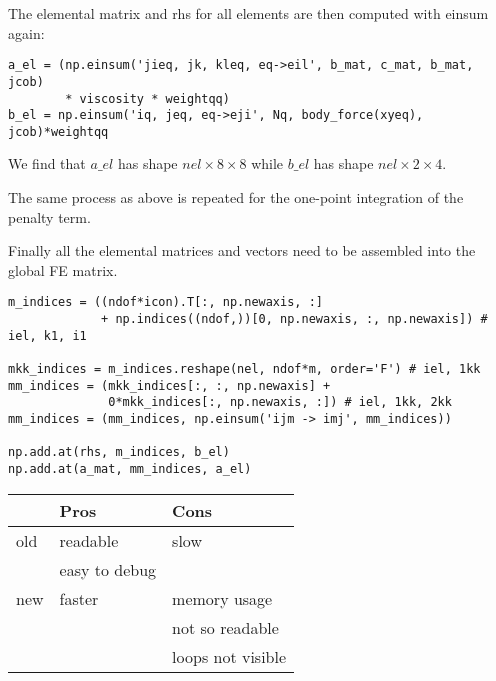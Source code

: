 The elemental matrix and rhs for all elements are then computed with einsum again:
\begin{lstlisting}
a_el = (np.einsum('jieq, jk, kleq, eq->eil', b_mat, c_mat, b_mat, jcob)
        * viscosity * weightqq)
b_el = np.einsum('iq, jeq, eq->eji', Nq, body_force(xyeq), jcob)*weightqq
\end{lstlisting}
We find that $a\_el$ has shape $nel\times8 \times 8$ while
$b\_el$ has shape $nel\times 2\times4$.

The same process as above is repeated for the one-point integration of the 
penalty term. 

Finally all the elemental matrices and vectors need to be assembled into 
the global FE matrix. 

\begin{lstlisting}
m_indices = ((ndof*icon).T[:, np.newaxis, :]
             + np.indices((ndof,))[0, np.newaxis, :, np.newaxis]) # iel, k1, i1

mkk_indices = m_indices.reshape(nel, ndof*m, order='F') # iel, 1kk
mm_indices = (mkk_indices[:, :, np.newaxis] +
              0*mkk_indices[:, np.newaxis, :]) # iel, 1kk, 2kk
mm_indices = (mm_indices, np.einsum('ijm -> imj', mm_indices))

np.add.at(rhs, m_indices, b_el)
np.add.at(a_mat, mm_indices, a_el)
\end{lstlisting}




\begin{tabular}{lll}
\hline
 & Pros & Cons \\
\hline
\hline
old & readable &  slow\\
    & easy to debug         &       \\
new & faster & memory usage \\
    &        & not so readable \\
    &        & loops not visible \\
\hline
\end{tabular}


